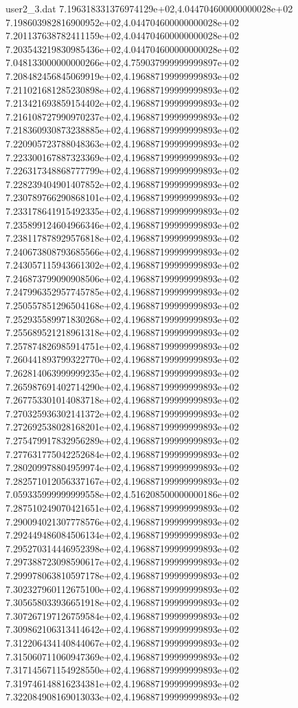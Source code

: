 \begin{filecontents}{user2_3.dat}
7.196318331376974129e+02,4.044704600000000028e+02
7.198603982816900952e+02,4.044704600000000028e+02
7.201137638782411159e+02,4.044704600000000028e+02
7.203543219830985436e+02,4.044704600000000028e+02
7.048133000000000266e+02,4.759037999999999897e+02
7.208482456845069919e+02,4.196887199999999893e+02
7.211021681285230898e+02,4.196887199999999893e+02
7.213421693859154402e+02,4.196887199999999893e+02
7.216108727990970237e+02,4.196887199999999893e+02
7.218360930873238885e+02,4.196887199999999893e+02
7.220905723788048363e+02,4.196887199999999893e+02
7.223300167887323369e+02,4.196887199999999893e+02
7.226317348868777799e+02,4.196887199999999893e+02
7.228239404901407852e+02,4.196887199999999893e+02
7.230789766290868101e+02,4.196887199999999893e+02
7.233178641915492335e+02,4.196887199999999893e+02
7.235899124604966346e+02,4.196887199999999893e+02
7.238117878929576818e+02,4.196887199999999893e+02
7.240673808793685566e+02,4.196887199999999893e+02
7.243057115943661302e+02,4.196887199999999893e+02
7.246873799090908506e+02,4.196887199999999893e+02
7.247996352957745785e+02,4.196887199999999893e+02
7.250557851296504168e+02,4.196887199999999893e+02
7.252935589971830268e+02,4.196887199999999893e+02
7.255689521218961318e+02,4.196887199999999893e+02
7.257874826985914751e+02,4.196887199999999893e+02
7.260441893799322770e+02,4.196887199999999893e+02
7.262814063999999235e+02,4.196887199999999893e+02
7.265987691402714290e+02,4.196887199999999893e+02
7.267753301014083718e+02,4.196887199999999893e+02
7.270325936302141372e+02,4.196887199999999893e+02
7.272692538028168201e+02,4.196887199999999893e+02
7.275479917832956289e+02,4.196887199999999893e+02
7.277631775042252684e+02,4.196887199999999893e+02
7.280209978804959974e+02,4.196887199999999893e+02
7.282571012056337167e+02,4.196887199999999893e+02
7.059335999999999558e+02,4.516208500000000186e+02
7.287510249070421651e+02,4.196887199999999893e+02
7.290094021307778576e+02,4.196887199999999893e+02
7.292449486084506134e+02,4.196887199999999893e+02
7.295270314446952398e+02,4.196887199999999893e+02
7.297388723098590617e+02,4.196887199999999893e+02
7.299978063810597178e+02,4.196887199999999893e+02
7.302327960112675100e+02,4.196887199999999893e+02
7.305658033936651918e+02,4.196887199999999893e+02
7.307267197126759584e+02,4.196887199999999893e+02
7.309862106313414642e+02,4.196887199999999893e+02
7.312206434140844067e+02,4.196887199999999893e+02
7.315060711060947369e+02,4.196887199999999893e+02
7.317145671154928550e+02,4.196887199999999893e+02
7.319746148816234381e+02,4.196887199999999893e+02
7.322084908169013033e+02,4.196887199999999893e+02

\end{filecontents}

